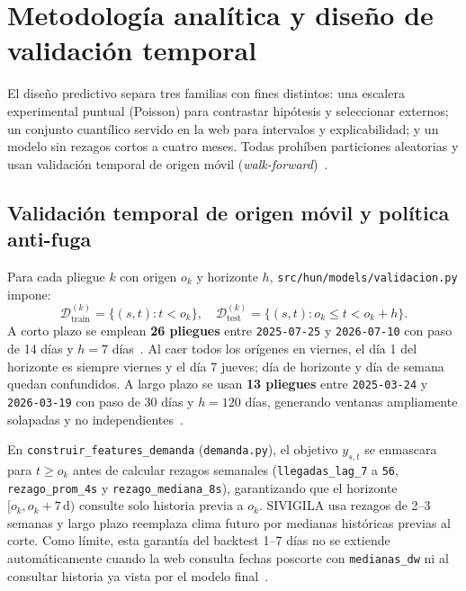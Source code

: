 
\section{Metodología analítica y diseño de validación temporal}

El diseño predictivo separa tres familias con fines distintos: una escalera experimental puntual (Poisson) para contrastar hipótesis y seleccionar externos; un conjunto cuantílico servido en la web para intervalos y explicabilidad; y un modelo sin rezagos cortos a cuatro meses. Todas prohíben particiones aleatorias y usan validación temporal de origen móvil (\textit{walk-forward})~\cite{hyndman_fpp3}.

\subsection{Validación temporal de origen móvil y política anti-fuga}

Para cada pliegue $k$ con origen $o_k$ y horizonte $h$, \texttt{src/hun/models/validacion.py} impone:
\begin{equation}
\label{eq:walk_forward}
\mathcal{D}_{\text{train}}^{(k)} = \{(s, t) : t < o_k\}, \quad
\mathcal{D}_{\text{test}}^{(k)} = \{(s, t) : o_k \le t < o_k + h\}.
\end{equation}
A corto plazo se emplean \textbf{26 pliegues} entre \texttt{2025-07-25} y \texttt{2026-07-10} con paso de 14 días y $h = 7$ días~\cite{mediflow2026demanda}. Al caer todos los orígenes en viernes, el día 1 del horizonte es siempre viernes y el día 7 jueves; día de horizonte y día de semana quedan confundidos. A largo plazo se usan \textbf{13 pliegues} entre \texttt{2025-03-24} y \texttt{2026-03-19} con paso de 30 días y $h = 120$ días, generando ventanas ampliamente solapadas y no independientes~\cite{mediflow2026largoplazo}.

En \texttt{construir\_features\_demanda} (\texttt{demanda.py}), el objetivo $y_{s,t}$ se enmascara para $t \ge o_k$ antes de calcular rezagos semanales (\texttt{llegadas\_lag\_7} a \texttt{56}, \texttt{rezago\_prom\_4s} y \texttt{rezago\_mediana\_8s}), garantizando que el horizonte $[o_k, o_k+7\,\text{d})$ consulte solo historia previa a $o_k$. SIVIGILA usa rezagos de 2--3 semanas y largo plazo reemplaza clima futuro por medianas históricas previas al corte. Como límite, esta garantía del backtest 1--7 días no se extiende automáticamente cuando la web consulta fechas poscorte con \texttt{medianas\_dw} ni al consultar historia ya vista por el modelo final~\cite{mediflow2026bundle,mediflow2026informe}.

